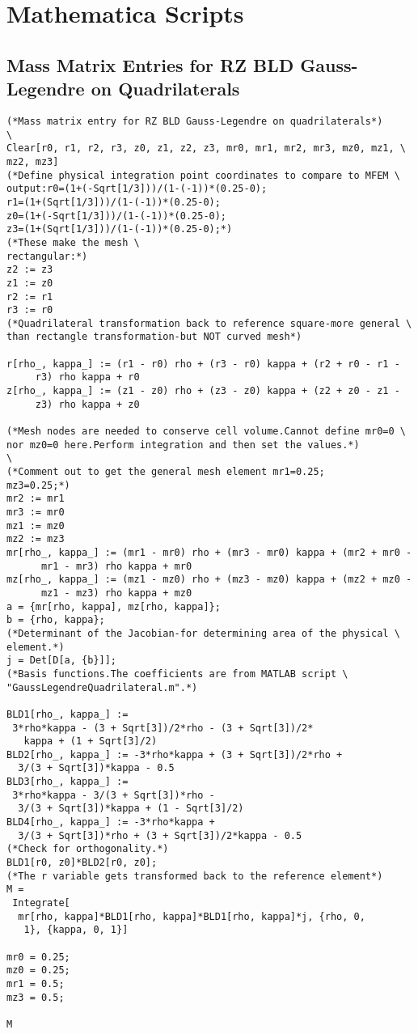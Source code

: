 \documentclass{article}
\begin{document}
\section{Mathematica Scripts}
\subsection{Mass Matrix Entries for RZ BLD Gauss-Legendre on Quadrilaterals}

\begin{verbatim}
(*Mass matrix entry for RZ BLD Gauss-Legendre on quadrilaterals*)
\
Clear[r0, r1, r2, r3, z0, z1, z2, z3, mr0, mr1, mr2, mr3, mz0, mz1, \
mz2, mz3]
(*Define physical integration point coordinates to compare to MFEM \
output:r0=(1+(-Sqrt[1/3]))/(1-(-1))*(0.25-0);
r1=(1+(Sqrt[1/3]))/(1-(-1))*(0.25-0);
z0=(1+(-Sqrt[1/3]))/(1-(-1))*(0.25-0);
z3=(1+(Sqrt[1/3]))/(1-(-1))*(0.25-0);*)
(*These make the mesh \
rectangular:*)
z2 := z3
z1 := z0
r2 := r1
r3 := r0
(*Quadrilateral transformation back to reference square-more general \
than rectangle transformation-but NOT curved mesh*)

r[rho_, kappa_] := (r1 - r0) rho + (r3 - r0) kappa + (r2 + r0 - r1 - 
     r3) rho kappa + r0
z[rho_, kappa_] := (z1 - z0) rho + (z3 - z0) kappa + (z2 + z0 - z1 - 
     z3) rho kappa + z0

(*Mesh nodes are needed to conserve cell volume.Cannot define mr0=0 \
nor mz0=0 here.Perform integration and then set the values.*)
\
(*Comment out to get the general mesh element mr1=0.25;
mz3=0.25;*)
mr2 := mr1
mr3 := mr0
mz1 := mz0
mz2 := mz3
mr[rho_, kappa_] := (mr1 - mr0) rho + (mr3 - mr0) kappa + (mr2 + mr0 -
      mr1 - mr3) rho kappa + mr0
mz[rho_, kappa_] := (mz1 - mz0) rho + (mz3 - mz0) kappa + (mz2 + mz0 -
      mz1 - mz3) rho kappa + mz0
a = {mr[rho, kappa], mz[rho, kappa]};
b = {rho, kappa};
(*Determinant of the Jacobian-for determining area of the physical \
element.*)
j = Det[D[a, {b}]];
(*Basis functions.The coefficients are from MATLAB script \
"GaussLegendreQuadrilateral.m".*)

BLD1[rho_, kappa_] := 
 3*rho*kappa - (3 + Sqrt[3])/2*rho - (3 + Sqrt[3])/2*
   kappa + (1 + Sqrt[3]/2)
BLD2[rho_, kappa_] := -3*rho*kappa + (3 + Sqrt[3])/2*rho + 
  3/(3 + Sqrt[3])*kappa - 0.5
BLD3[rho_, kappa_] := 
 3*rho*kappa - 3/(3 + Sqrt[3])*rho - 
  3/(3 + Sqrt[3])*kappa + (1 - Sqrt[3]/2)
BLD4[rho_, kappa_] := -3*rho*kappa + 
  3/(3 + Sqrt[3])*rho + (3 + Sqrt[3])/2*kappa - 0.5
(*Check for orthogonality.*)
BLD1[r0, z0]*BLD2[r0, z0];
(*The r variable gets transformed back to the reference element*)
M = 
 Integrate[
  mr[rho, kappa]*BLD1[rho, kappa]*BLD1[rho, kappa]*j, {rho, 0, 
   1}, {kappa, 0, 1}]

mr0 = 0.25;
mz0 = 0.25;
mr1 = 0.5;
mz3 = 0.5;

M
\end{verbatim}
\end{document}
